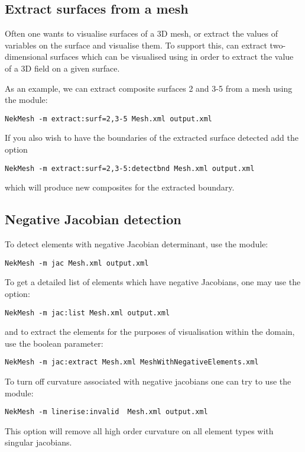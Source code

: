 \subsection{Extract surfaces from a mesh}
\label{s:utilities:nekmesh:extract}

Often one wants to visualise surfaces of a 3D mesh, or extract the values of
variables on the surface and visualise them. To support this, \nm can extract
two-dimensional surfaces which can be visualised using  in
order to extract the value of a 3D field on a given surface.

As an example, we can extract composite surfaces 2 and 3-5 from a mesh using the
 module:
%
\begin{lstlisting}[style=BashInputStyle]
NekMesh -m extract:surf=2,3-5 Mesh.xml output.xml
\end{lstlisting}
%
If you also wish to have the boundaries of the extracted surface detected add
the  option
%
\begin{lstlisting}[style=BashInputStyle]
NekMesh -m extract:surf=2,3-5:detectbnd Mesh.xml output.xml
\end{lstlisting}
which will produce new composites for the extracted boundary.

\subsection{Negative Jacobian detection}

To detect elements with negative Jacobian determinant, use the 
module:
%
\begin{lstlisting}[style=BashInputStyle]
NekMesh -m jac Mesh.xml output.xml
\end{lstlisting}
%
To get a detailed list of elements which have negative Jacobians, one may use
the  option:
%
\begin{lstlisting}[style=BashInputStyle]
NekMesh -m jac:list Mesh.xml output.xml
\end{lstlisting}
%
and to extract the elements for the purposes of visualisation within the domain,
use the  boolean parameter:
%
\begin{lstlisting}[style=BashInputStyle]
NekMesh -m jac:extract Mesh.xml MeshWithNegativeElements.xml
\end{lstlisting}

To turn off curvature associated with negative jacobians one can try to use the
 module:
\begin{lstlisting}[style=BashInputStyle]
NekMesh -m linerise:invalid  Mesh.xml output.xml
\end{lstlisting}
This option will remove all high order curvature on all element types
with singular jacobians.

